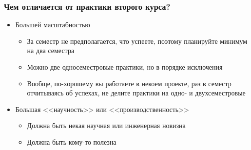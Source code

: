 \documentclass{../../slides-style}
\begin{document}
    
    \begin{frame}[plain]
        \titlepage
    \end{frame}

    \begin{frame}
        \frametitle{Чем отличается от практики второго курса?}
        \begin{itemize}
            \item Большей масштабностью
            \begin{itemize}
                \item За семестр не предполагается, что успеете, поэтому планируйте минимум на два семестра
                \item Можно две односеместровые практики, но в порядке исключения
                \item Вообще, по-хорошему вы работаете в некоем проекте, раз в семестр отчитываясь об успехах, не делите практики на одно- и двухсеместровые
            \end{itemize}
            \item Большая <<научность>> или <<производственность>>
            \begin{itemize}
                \item Должна быть некая научная или инженерная новизна
                \item Должна быть кому-то полезна
            \end{itemize}
        \end{itemize}
    \end{frame}
\end{document}
